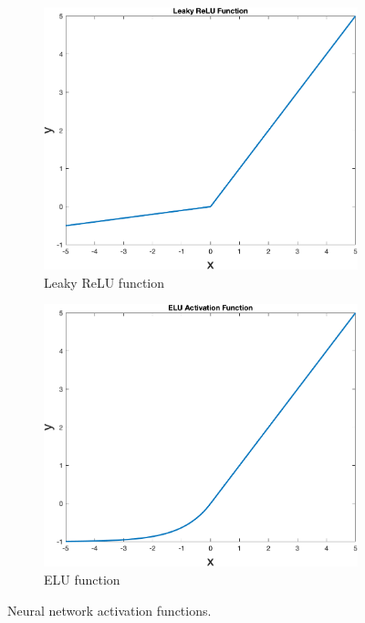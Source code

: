 \begin{figure}
\begin{subfigure}[b]{0.4\textwidth}
        \label{fig:sigmsoftmaxoid}
    \end{subfigure}
    \begin{subfigure}[b]{0.4\textwidth}
        \includegraphics[width=\textwidth]{figures/leakyrelu}
        \caption{Leaky ReLU function}
        \label{fig:leakyrelu}
    \end{subfigure}
    \hspace{0.1\textwidth}
    \begin{subfigure}[b]{0.4\textwidth}
        \includegraphics[width=\textwidth]{figures/elu}
        \caption{ELU function}
        \label{fig:elu}
    \end{subfigure}
    \caption{Neural network activation functions.}
    \label{fig:activationfunctions}
\end{figure}

